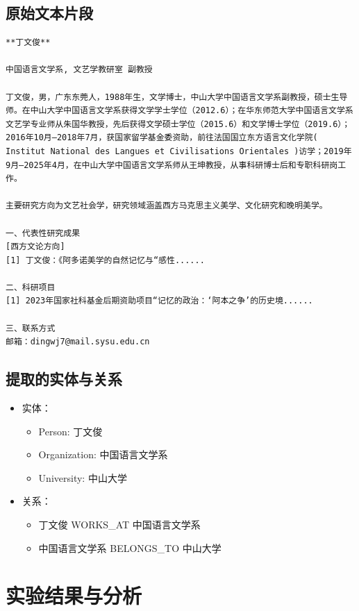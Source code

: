 \subsection{原始文本片段}
\begin{lstlisting}[style=cleanpython]
**丁文俊**

中国语言文学系, 文艺学教研室 副教授

丁文俊，男，广东东莞人，1988年生，文学博士，中山大学中国语言文学系副教授，硕士生导师。在中山大学中国语言文学系获得文学学士学位（2012.6）；在华东师范大学中国语言文学系文艺学专业师从朱国华教授，先后获得文学硕士学位（2015.6）和文学博士学位（2019.6）；2016年10月—2018年7月，获国家留学基金委资助，前往法国国立东方语言文化学院( Institut National des Langues et Civilisations Orientales )访学；2019年9月—2025年4月，在中山大学中国语言文学系师从王坤教授，从事科研博士后和专职科研岗工作。  

主要研究方向为文艺社会学，研究领域涵盖西方马克思主义美学、文化研究和晚明美学。

一、代表性研究成果  
[西方文论方向]  
[1] 丁文俊：《阿多诺美学的自然记忆与“感性......
  
二、科研项目  
[1] 2023年国家社科基金后期资助项目“记忆的政治：‘阿本之争’的历史境......

三、联系方式  
邮箱：dingwj7@mail.sysu.edu.cn

\end{lstlisting}

\subsection{提取的实体与关系}
\begin{itemize}
    \item 实体：
    \begin{itemize}
        \item Person: 丁文俊
        \item Organization: 中国语言文学系
        \item University: 中山大学
    \end{itemize}
    \item 关系：
    \begin{itemize}
        \item 丁文俊 WORKS\_AT 中国语言文学系
        \item 中国语言文学系 BELONGS\_TO 中山大学
    \end{itemize}
\end{itemize}

\section{实验结果与分析}
